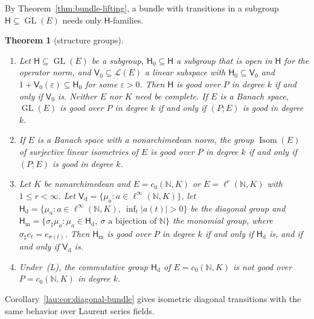 \documentclass[11pt]{amsart}
\newtheorem{theorem}{Theorem}[section]
\theoremstyle{definition}
\theoremstyle{remark}
\numberwithin{equation}{section}
\newcommand{\N}{\mathbb N}
\newcommand{\cL}{\mathcal L}
\newcommand{\linf}{\ell^\infty}
\newcommand{\abs}[1]{\lvert #1\rvert}
\theoremstyle{plain}
\theoremstyle{definition}
\theoremstyle{plain}
\begin{document}
By Theorem~\ref{thm:bundle-lifting}, a bundle with transitions in a subgroup $\mathsf H\subseteq\operatorname{GL}(E)$ needs
only $\mathsf H$-families.

\begin{theorem}[structure groups]\label{fam2:thm:groups}
\begin{enumerate}
\item Let $\mathsf H\subseteq\operatorname{GL}(E)$ be a subgroup, $\mathsf H_0\subseteq\mathsf H$ a subgroup that is open in
$\mathsf H$ for the operator norm, and $\mathsf V_0\subseteq\cL(E)$ a linear subspace with $\mathsf H_0\subseteq\mathsf V_0$
and $1+\mathsf V_0(\varepsilon)\subseteq\mathsf H_0$ for some $\varepsilon>0$. Then $\mathsf H$ is good over $P$ in degree
$k$ if and only if $\mathsf V_0$ is. Neither $E$ nor $K$ need be complete. If $E$ is a Banach space, $\operatorname{GL}(E)$ is
good over $P$ in degree $k$ if and only if $(P;E)$ is good in degree $k$.
\item If $E$ is a Banach space with a nonarchimedean norm, the group $\operatorname{Isom}(E)$ of surjective
linear isometries of $E$ is good over $P$ in degree $k$ if and only if $(P;E)$ is good in degree $k$.
\item Let $K$ be nonarchimedean and $E=c_0(\N,K)$ or $E=\ell^r(\N,K)$ with $1\le r<\infty$. Let
$\mathsf V_{\mathrm d}=\{\mu_a:a\in\linf(\N,K)\}$, let
$\mathsf H_{\mathrm d}=\{\mu_a:a\in\linf(\N,K),\ \inf_t\abs{a(t)}>0\}$ be the diagonal group and
$\mathsf H_{\mathrm m}=\{\sigma_\sharp\mu_a:\mu_a\in\mathsf H_{\mathrm d},\ \sigma\text{ a bijection of }\N\}$ the monomial
group, where $\sigma_\sharp e_t=e_{\sigma(t)}$. Then $\mathsf H_{\mathrm m}$ is good over $P$ in degree $k$ if and only if
$\mathsf H_{\mathrm d}$ is, and if and only if $\mathsf V_{\mathrm d}$ is.
\item Under~\textup{(L)}, the commutative group $\mathsf H_{\mathrm d}$ of $E=c_0(\N,K)$ is not good over $P=c_0(\N,K)$ in
degree $k$.
\end{enumerate}
\end{theorem}

Corollary~\ref{lau:cor:diagonal-bundle} gives isometric diagonal transitions with the same behavior over Laurent series
fields.
\end{document}

